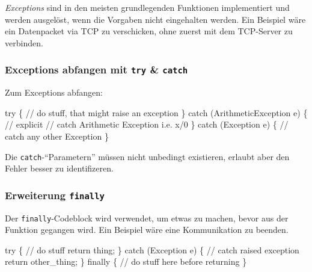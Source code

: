 \documentclass[
  9pt,
  a4paperpaper,
  DIV=11]{scrartcl}
\newenvironment{Shaded}{}{}
\newcommand{\CommentTok}[1]{\textcolor[rgb]{0.42,0.45,0.49}{#1}}
\newcommand{\KeywordTok}[1]{\textcolor[rgb]{0.84,0.23,0.29}{#1}}
\newcommand{\NormalTok}[1]{\textcolor[rgb]{0.14,0.16,0.18}{#1}}
\newcommand{\OperatorTok}[1]{\textcolor[rgb]{0.14,0.16,0.18}{#1}}
\numberwithin{equation}{section}
\begin{document}
\begin{multicols}{2}
\begin{tcolorbox}
\begin{tcolorbox}
\begin{tcolorbox}
\begin{tcolorbox}
\begin{tcolorbox}
\begin{tcolorbox}
\emph{Exceptions} sind in den meisten grundlegenden Funktionen
implementiert und werden ausgelöst, wenn die Vorgaben nicht eingehalten
werden. Ein Beispiel wäre ein Datenpacket via TCP zu verschicken, ohne
zuerst mit dem TCP-Server zu verbinden.

\hypertarget{exceptions-abfangen-mit-try-catch}{%
\subsubsection{\texorpdfstring{Exceptions abfangen mit \texttt{try} \&
\texttt{catch}}{Exceptions abfangen mit try \& catch}}\label{exceptions-abfangen-mit-try-catch}}

Zum Exceptions abfangen:

\begin{Shaded}
\begin{Highlighting}[]
\KeywordTok{try} \OperatorTok{\{}
  \CommentTok{// do stuff, that might raise an exception}
\OperatorTok{\}}
\KeywordTok{catch} \OperatorTok{(}\NormalTok{ArithmeticException e}\OperatorTok{)} \OperatorTok{\{} \CommentTok{// explicit}
  \CommentTok{// catch Arithmetic Exception i.e. x/0}
\OperatorTok{\}}
\KeywordTok{catch} \OperatorTok{(}\NormalTok{Exception e}\OperatorTok{)} \OperatorTok{\{}
  \CommentTok{// catch any other Exception}
\OperatorTok{\}}
\end{Highlighting}
\end{Shaded}

Die \texttt{catch}-``Parametern'' müssen nicht unbedingt existieren,
erlaubt aber den Fehler besser zu identifizeren.

\hypertarget{erweiterung-finally}{%
\subsubsection{\texorpdfstring{Erweiterung
\texttt{finally}}{Erweiterung finally}}\label{erweiterung-finally}}

Der \texttt{finally}-Codeblock wird verwendet, um etwas zu machen, bevor
aus der Funktion gegangen wird. Ein Beispiel wäre eine Kommunikation zu
beenden.

\begin{Shaded}
\begin{Highlighting}[]
\KeywordTok{try} \OperatorTok{\{}
  \CommentTok{// do stuff}
  \KeywordTok{return}\NormalTok{ thing}\OperatorTok{;}
\OperatorTok{\}}
\KeywordTok{catch} \OperatorTok{(}\NormalTok{Exception e}\OperatorTok{)} \OperatorTok{\{}
  \CommentTok{// catch raised exception}
  \KeywordTok{return}\NormalTok{ other\_thing}\OperatorTok{;}
\OperatorTok{\}}
\KeywordTok{finally} \OperatorTok{\{}
  \CommentTok{// do stuff here before returning}
\OperatorTok{\}}
\end{Highlighting}
\end{Shaded}


\end{tcolorbox}
\end{tcolorbox}
\end{tcolorbox}
\end{tcolorbox}
\end{tcolorbox}
\end{tcolorbox}
\end{multicols}
\end{document}

